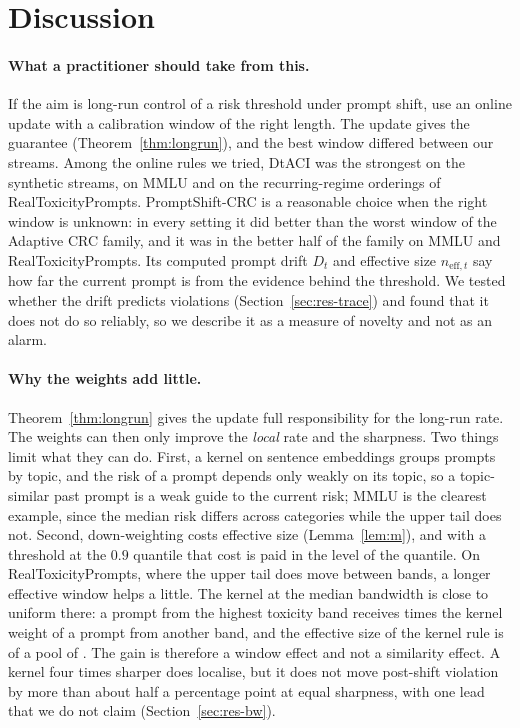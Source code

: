 
\section{Discussion}\label{sec:discussion}

\paragraph{What a practitioner should take from this.}
If the aim is long-run control of a risk threshold under prompt shift, use an online update with a calibration window of the right length. The update gives the guarantee (Theorem~\ref{thm:longrun}), and the best window differed between our streams. Among the online rules we tried, DtACI was the strongest on the synthetic streams, on MMLU and on the recurring-regime orderings of RealToxicityPrompts. PromptShift-CRC is a reasonable choice when the right window is unknown: in every setting it did better than the worst window of the Adaptive CRC family, and it was in the better half of the family on MMLU and RealToxicityPrompts. Its computed prompt drift $D_t$ and effective size $n_{\mathrm{eff},t}$ say how far the current prompt is from the evidence behind the threshold. We tested whether the drift predicts violations (Section~\ref{sec:res-trace}) and found that it does not do so reliably, so we describe it as a measure of novelty and not as an alarm.

\paragraph{Why the weights add little.}
Theorem~\ref{thm:longrun} gives the update full responsibility for the long-run rate. The weights can then only improve the \emph{local} rate and the sharpness. Two things limit what they can do. First, a kernel on sentence embeddings groups prompts by topic, and the risk of a prompt depends only weakly on its topic, so a topic-similar past prompt is a weak guide to the current risk; MMLU is the clearest example, since the median risk differs across categories while the upper tail does not. Second, down-weighting costs effective size (Lemma~\ref{lem:m}), and with a threshold at the $0.9$ quantile that cost is paid in the level of the quantile. On RealToxicityPrompts, where the upper tail does move between bands, a longer effective window helps a little. The kernel at the median bandwidth is close to uniform there: a prompt from the highest toxicity band receives \RtpKernelRatio{} times the kernel weight of a prompt from another band, and the effective size of the kernel rule is \RtpKernelNeff{} of a pool of \PoolLen{}. The gain is therefore a window effect and not a similarity effect. A kernel four times sharper does localise, but it does not move post-shift violation by more than about half a percentage point at equal sharpness, with one lead that we do not claim (Section~\ref{sec:res-bw}).

